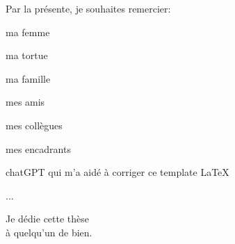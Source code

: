 \documentclass[11pt]{template/thesul}
\begin{document}
\begin{ThesisAcknowledgments}

    Par la présente, je souhaites remercier:
    \begin{todolist}
        \item ma femme
        \item ma tortue
        \item ma famille
        \item mes amis
        \item mes collègues
        \item mes encadrants
        \item chatGPT qui m'a aidé à corriger ce template LaTeX
        \item ...
    \end{todolist}

\end{ThesisAcknowledgments}


\begin{ThesisDedication}

    Je dédie cette thèse\\
    à quelqu'un de bien.

\end{ThesisDedication}


\renewcommand{\contentsname}{Table des matières}
\tableofcontents




\mainmatter


\end{document}
